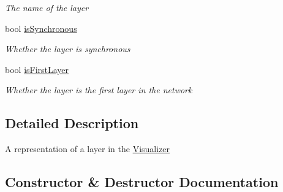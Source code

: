 \begin{DoxyCompactItemize}
\begin{DoxyCompactList}\small\item\em The name of the layer \end{DoxyCompactList}\item 
bool \hyperlink{class_n_n_gen_1_1_visualizer_layer_ae0cf894b1f6ca60a8cbcfd3e862763f7}{is\+Synchronous}
\begin{DoxyCompactList}\small\item\em Whether the layer is synchronous \end{DoxyCompactList}\item 
bool \hyperlink{class_n_n_gen_1_1_visualizer_layer_a260e665a2e4ec4651ff796c4de269eca}{is\+First\+Layer}
\begin{DoxyCompactList}\small\item\em Whether the layer is the first layer in the network \end{DoxyCompactList}\end{DoxyCompactItemize}


\subsection{Detailed Description}
A representation of a layer in the \hyperlink{class_n_n_gen_1_1_visualizer}{Visualizer} 



\subsection{Constructor \& Destructor Documentation}
\hypertarget{class_n_n_gen_1_1_visualizer_layer_a68a8bef64c4066c35865f8f505e6afe7}{}
